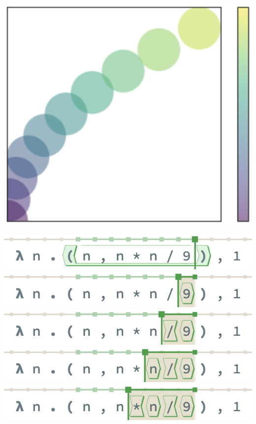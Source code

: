 \noindent
\begin{minipage}[t]{0.2\columnwidth}
  \includegraphics[width=\textwidth]{img/circles-parabola-transpose.png}
\end{minipage}
\hfill
\begin{minipage}{0.65\columnwidth}
  \includegraphics[width=\textwidth]{img/selection-whole-0.png}
  \includegraphics[width=\textwidth]{img/selection-whole-1.png}
  \includegraphics[width=\textwidth]{img/selection-whole-2.png}
  \includegraphics[width=\textwidth]{img/selection-whole-3.png}
  \includegraphics[width=\textwidth]{img/selection-whole-4.png}
\end{minipage}

